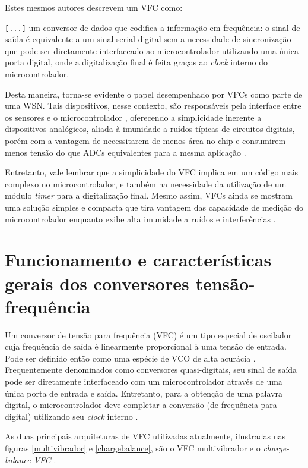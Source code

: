 \documentclass[
	12pt,				%
	oneside,			%
	a4paper,			%
	english,			%
	french,				%
	spanish,			%
	brazil				%
	]{abntex2}
\begin{document}
Estes mesmos autores descrevem um VFC como:
\begin{citacao}
\verb|[...]| um conversor de dados que codifica a informação em frequência: o sinal de saída é equivalente a um sinal serial digital sem a necessidade de sincronização que pode ser diretamente interfaceado ao microcontrolador utilizando uma única porta digital, onde a digitalização final é feita graças ao \emph{clock} interno do microcontrolador.
\end{citacao}

Desta maneira, torna-se evidente o papel desempenhado por VFCs como parte de uma WSN. Tais dispositivos, nesse contexto, são responsáveis pela interface entre os sensores e o microcontrolador \cite{meijer}, oferecendo a simplicidade inerente a dispositivos analógicos, aliada à imunidade a ruídos típicas de circuitos digitais, porém com a vantagem de necessitarem de menos área no chip e consumirem menos tensão do que ADCs equivalentes para a mesma aplicação \cite{VFCbook}. 

Entretanto, vale lembrar que a simplicidade do VFC implica em um código mais complexo no microcontrolador, e também na necessidade da utilização de um módulo \textit{timer} para a digitalização final. Mesmo assim, VFCs ainda se mostram uma solução simples e compacta que tira vantagem das capacidade de medição do microcontrolador enquanto exibe alta imunidade a ruídos e interferências \cite{ferrari}.  

\section{Funcionamento e características gerais dos conversores tensão-frequência}
Um conversor de tensão para frequência (VFC) é um tipo especial de oscilador cuja frequência de saída é linearmente proporcional à uma tensão de entrada. Pode ser definido então como uma espécie de VCO de alta acurácia \cite{handbook}. Frequentemente denominados como conversores quasi-digitais, seu sinal de saída pode ser diretamente interfaceado com um microcontrolador através de uma única porta de entrada e saída. Entretanto, para a obtenção de uma palavra digital, o microcontrolador deve completar a conversão (de frequência para digital) utilizando seu \emph{clock} interno \cite{VFCbook}. 

As duas principais arquiteturas de VFC utilizadas atualmente, ilustradas nas figuras \ref{multivibrador} e \ref{chargebalance}, são o VFC multivibrador e o \textit{charge-balance VFC} \cite{handbook}.
\end{document}
